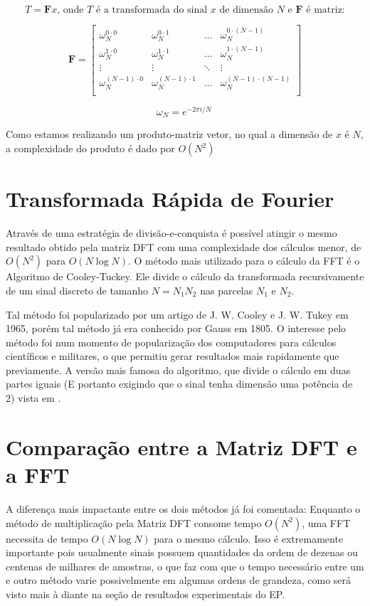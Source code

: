\documentclass[brazil,times]{abnt}
\begin{document}
		$$T = \mathbf{F}x \text{, onde $T$ é a transformada do sinal $x$ de dimensão $N$ e $\mathbf{F}$ é matriz:}$$

		$$
		\mathbf{F} =
		\begin{bmatrix}
			\omega_N^{0 \cdot 0}     & \omega_N^{0 \cdot 1}     & \ldots & \omega_N^{0 \cdot (N-1)}     \\
			\omega_N^{1 \cdot 0}     & \omega_N^{1 \cdot 1}     & \ldots & \omega_N^{1 \cdot (N-1)}     \\
			\vdots                   & \vdots                   & \ddots & \vdots                       \\
			\omega_N^{(N-1) \cdot 0} & \omega_N^{(N-1) \cdot 1} & \ldots & \omega_N^{(N-1) \cdot (N-1)} \\
		\end{bmatrix}
		$$

		$$\omega_N = e^{-2 \pi i/N}\,$$


		Como estamos realizando um produto-matriz vetor, no qual a dimensão de $x$ é $N$, a complexidade do produto é dado por $O(N^2)$

	\section{Transformada Rápida de Fourier}
		Através de uma estratégia de divisão-e-conquista é possível atingir o mesmo resultado obtido pela matriz DFT com uma complexidade dos cálculos menor, de $O(N^2)$ para $O(N\log{N})$. O método mais utilizado para o cálculo da FFT é o Algoritmo de Cooley-Tuckey. Ele divide o cálculo da transformada recursivamente de um sinal discreto de tamanho $N = N_1 N_2$ nas parcelas $N_1$ e $N_2$.
		
		Tal método foi popularizado por um artigo de J. W. Cooley e J. W. Tukey em 1965, porém tal método já era conhecido por Gauss em 1805. O interesse pelo método foi num momento de popularização dos computadores para cálculos científicos e militares, o que permitiu gerar resultados mais rapidamente que previamente. A versão mais famosa do algoritmo, que divide o cálculo em duas partes iguais (E portanto exigindo que o sinal tenha dimensão uma potência de 2) vista em \cite{wiki:cooley-tukey}.


	\section{Comparação entre a Matriz DFT e a FFT}
		A diferença mais impactante entre os dois métodos já foi comentada: Enquanto o método de multiplicação pela Matriz DFT consome tempo $O(N^2)$, uma FFT necessita de tempo $O(N\log{N})$ para o mesmo cálculo. Isso é extremamente importante pois usualmente sinais possuem quantidades da ordem de dezenas ou centenas de milhares de amostras, o que faz com que o tempo necessário entre um e outro método varie possivelmente em algumas ordens de grandeza, como será visto mais à diante na seção de resultados experimentais do EP.
	
\end{document}
